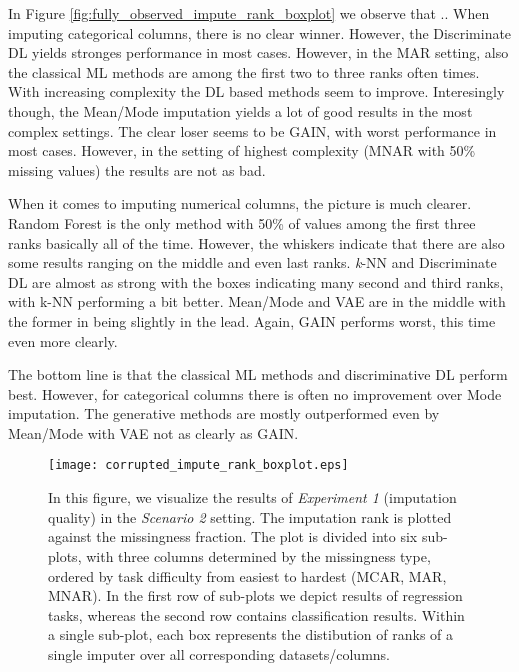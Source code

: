 In Figure \ref{fig:fully_observed_impute_rank_boxplot} we observe that ..
When imputing categorical columns, there is no clear winner. However, the Discriminate DL yields stronges performance in most cases. However, in the MAR setting, also the classical ML methods are among the first two to three ranks often times. With increasing complexity the DL based methods seem to improve. Interesingly though, the Mean/Mode imputation yields a lot of good results in the most complex settings.
The clear loser seems to be GAIN, with worst performance in most cases. However, in the setting of highest complexity (MNAR with 50\% missing values) the results are not as bad.

When it comes to imputing numerical columns, the picture is much clearer. Random Forest is the only method with 50\% of values among the first three ranks basically all of the time. However, the whiskers indicate that there are also some results ranging on the middle and even last ranks. \textit{k}-NN and Discriminate DL are almost as strong with the boxes indicating many second and third ranks, with k-NN performing a bit better. Mean/Mode and VAE are in the middle with the former in being slightly in the lead. Again, GAIN performs worst, this time even more clearly.

The bottom line is that the classical ML methods and discriminative DL perform best. However, for categorical columns there is often no improvement over Mode imputation. The generative methods are mostly outperformed even by Mean/Mode with VAE not as clearly as GAIN.

\begin{figure}\centering
    \texttt{[image: corrupted\_impute\_rank\_boxplot.eps]}

    \caption[Scenario 2 Imputation Ranks]{In this figure, we visualize the results of \textit{Experiment 1} (imputation quality) in the \textit{Scenario 2} setting. The imputation rank is plotted against the missingness fraction. The plot is divided into six sub-plots, with three columns determined by the missingness type, ordered by task difficulty from easiest to hardest (MCAR, MAR, MNAR). In the first row of sub-plots we depict results of regression tasks, whereas the second row contains classification results. Within a single sub-plot, each box represents the distibution of ranks of a single imputer over all corresponding datasets/columns.
    }
	\label{fig:corrupted_impute_rank_boxplot}
\end{figure}

